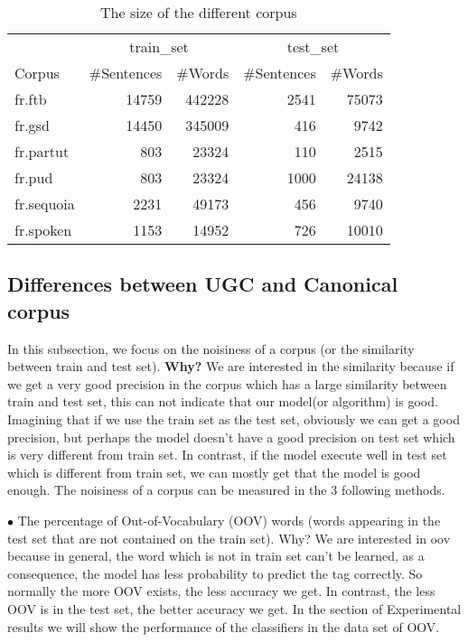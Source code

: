 \documentclass{article}
\begin{document}
\begin{table}[h]
    \caption{The size of the different corpus}
    \vspace{5pt}
    \centering
    
\begin{tabular}{|l|rr|rr|}
\hline
\multicolumn{1}{|c|}{\ } & \multicolumn{2}{c|}{train\_set} & \multicolumn{2}{c|}{test\_set}\\ 
\cline{2-5}
Corpus & \#Sentences & \#Words & \#Sentences & \#Words\\
\hline
fr.ftb     & 14759 & 442228 & 2541 & 75073 \\
fr.gsd     & 14450 & 345009 & 416  & 9742\\
fr.partut  & 803   & 23324  & 110  & 2515\\
fr.pud     & 803   & 23324  & 1000 & 24138\\
fr.sequoia & 2231  & 49173  & 456  & 9740\\
fr.spoken  & 1153  & 14952  & 726  & 10010\\
\hline
\end{tabular}
\label{table_size}
\end{table}


\subsection{Differences between UGC and Canonical corpus}
In this subsection, we focus on the noisiness of a corpus (or the similarity between train and test set).  \textbf{Why?} We are interested in the similarity because if we get a very good precision in the corpus which has a large similarity between train and test set, this can not indicate that our model(or algorithm) is good. Imagining that if we use the train set as the test set, obviously we can get a good precision, but perhaps the model doesn't have a good precision on test set which is very different from train set. In contrast, if the model execute well in test set which is different from train set, we can mostly get that the model is good enough. The noisiness of a corpus can be measured in the 3 following methods.

$\bullet$ The percentage of Out-of-Vocabulary (OOV) words (words appearing in the test set that are not contained on the train set).
\textsf{Why?} We are interested in oov because in general, the word which is not in train set can't be learned, as a consequence, the model has less probability to predict the tag correctly. So normally the more OOV exists, the less accuracy we get. In contrast, the less OOV is in the test set, the better accuracy we get. In the section of Experimental results we will show the performance of the classifiers in the data set of OOV.
\end{document}

